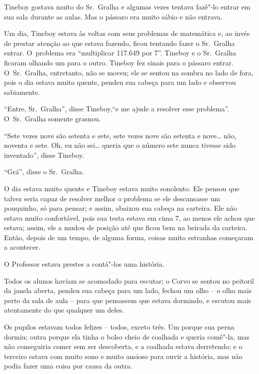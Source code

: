 

Tineboy gostava muito do Sr.~Gralha e algumas vezes tentava fazê"-lo
entrar em sua sala durante as aulas. Mas o pássaro era muito sábio e não
entrava.

Um dia, Tineboy estava às voltas com seus problemas de matemática e, ao
invés de prestar atenção ao que estava fazendo, ficou tentando fazer o
Sr.~Gralha entrar. O~problema era ``multiplicar 117.649 por 7''. Tineboy
e o Sr.~Gralha ficaram olhando um para o outro. Tineboy fez sinais para
o pássaro entrar. O~Sr.~Gralha, entretanto, não se moveu; ele se sentou
na sombra no lado de fora, pois o dia estava muito quente, pendeu sua
cabeça para um lado e observou sabiamente.

``Entre, Sr.~Gralha'', disse Tineboy,``e me ajude a resolver esse
problema''. O~Sr.~Gralha somente grasnou.

``Sete vezes nove são setenta e sete, sete vezes nove são setenta e
nove… não, noventa e sete. Oh, eu não sei… queria que o
número sete nunca tivesse sido inventado'', disse Tineboy.

``Grá'', disse o Sr.~Gralha.

O dia estava muito quente e Tineboy estava muito sonolento. Ele pensou
que talvez seria capaz de resolver melhor o problema se ele descansasse
um pouquinho, só para pensar; e assim, abaixou sua cabeça na carteira.
Ele não estava muito confortável, pois sua testa estava em cima 7, ao menos
ele achou que estava; assim, ele a mudou de posição até que ficou bem na
beirada da carteira. Então, depois de um tempo, de alguma forma, coisas
muito estranhas começaram a acontecer.

O Professor estava prestes a contá"-los uma história.

Todos os alunos haviam se acomodado para escutar; o Corvo se sentou no
peitoril da janela aberta, pendeu sua cabeça para um lado, fechou um
olho -- o olho mais perto da sala de aula -- para que pensassem que
estava dormindo, e escutou mais atentamente do que qualquer um deles.


Os pupilos estavam todos felizes -- todos, exceto três. Um porque sua
perna dormiu; outra porque ela tinha o bolso cheio de coalhada e queria
comê"-la, mas não conseguiria comer sem ser descoberta, e a coalhada
estava derretendo; e o terceiro estava com muito sono e muito ansioso
para ouvir a história, mas não podia fazer uma coisa por causa da outra.


